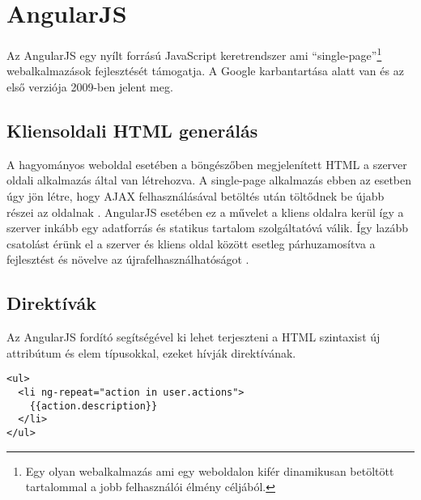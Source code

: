 \section{AngularJS}




Az AngularJS egy nyílt forrású JavaScript keretrendszer ami ``single-page''\footnote{Egy olyan webalkalmazás ami egy weboldalon kifér dinamikusan betöltött tartalommal a jobb felhasználói élmény céljából.} webalkalmazások fejlesztését támogatja. A Google karbantartása alatt van és az első verziója 2009-ben jelent meg. 

\subsection{Kliensoldali HTML generálás}


A hagyományos weboldal esetében a böngészőben megjelenített HTML a szerver oldali alkalmazás által van létrehozva.  A single-page alkalmazás ebben az esetben úgy jön létre, hogy AJAX felhasználásával betöltés után töltődnek be újabb részei az oldalnak \cite{angularbook}. AngularJS esetében ez a művelet a kliens oldalra kerül így a szerver inkább egy adatforrás és statikus tartalom szolgáltatóvá válik. Így lazább csatolást érünk el a szerver és kliens oldal között esetleg párhuzamosítva a fejlesztést és növelve az újrafelhasználhatóságot \cite{AngularDocConcepts}.





\subsection{Direktívák}

Az AngularJS fordító segítségével ki lehet terjeszteni a HTML szintaxist új attribútum és elem típusokkal, ezeket hívják direktívának. 

\lstset{language=HTML}
\begin{lstlisting}[frame=single]  
<ul>
  <li ng-repeat="action in user.actions">
    {{action.description}}
  </li>
</ul>
\end{lstlisting}


